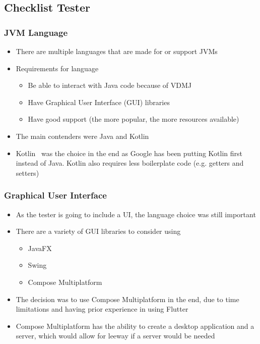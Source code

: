 \documentclass[../dissertation.tex]{subfiles}
\begin{document}
\subsection{Checklist Tester}
\subsubsection{JVM Language}
\begin{itemize}
  \item There are multiple languages that are made for or support JVMs~\cite{jvm-alt-lang}
  \item Requirements for language
    \begin{itemize}
      \item Be able to interact with Java code because of VDMJ
      \item Have Graphical User Interface (GUI) libraries
      \item Have good support (the more popular, the more resources available)
    \end{itemize}
  \item The main contenders were Java and Kotlin~\cite{kotlin}
  \item Kotlin~\cite{kotlin} was the choice in the end as Google has been putting Kotlin first
    instead of Java. Kotlin also requires less boilerplate code (e.g. getters and setters)~\cite{android-kotlin}

\end{itemize}

\subsubsection{Graphical User Interface}
\begin{itemize}
  \item As the tester is going to include a UI, the language choice was still important
    \item There are a variety of GUI libraries to consider using
    \begin{itemize}
      \item JavaFX~\cite{javafx}
      \item Swing~\cite{flatlaf}
      \item Compose Multiplatform~\cite{compose}
    \end{itemize}
  \item The decision was to use Compose Multiplatform in the end, due to time limitations and
    having prior experience in using Flutter~\cite{flutter}
  \item Compose Multiplatform has the ability to create a desktop application and a server,
    which would allow for leeway if a server would be needed
\end{itemize}
\end{document}
